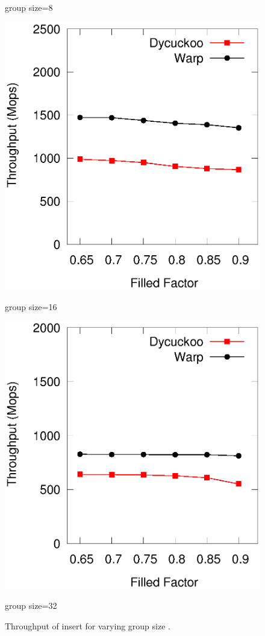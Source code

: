 \begin{figure}[htp]
\begin{minipage}{0.16\linewidth}
		\centerline{group size=8}	
		\end{minipage}
	\begin{minipage}{0.16\linewidth}\centering
		\includegraphics[width=\linewidth]{pic/group-size/g16-insert.eps}
		\centerline{group size=16}
	\end{minipage}
	\begin{minipage}{0.16\linewidth}\centering
		\includegraphics[width=\linewidth]{pic/group-size/g32-insert.eps}
		\centerline{group size=32}
	\end{minipage}
	\caption{Throughput of insert for varying group size .}
	\label{fig:vary-upper-time}
\end{figure}


